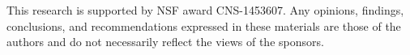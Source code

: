 This research is supported by NSF award CNS-1453607. 
Any opinions, findings, conclusions, and recommendations expressed in these
materials are those of the authors and do not necessarily reflect the
views of the sponsors.